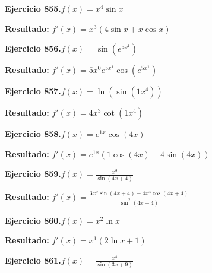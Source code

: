 \documentclass[10pt,a4paper]{article}
\begin{document}
\begin{ejbox}
\textbf{Ejercicio 855.}\quad $f(x) = x^{4} \sin x$
\end{ejbox}

\begin{solbox}
\textbf{Resultado:} \(\displaystyle f'(x) = x^{3}(4\sin x + x\cos x)\)
\end{solbox}

\newpage
\begin{ejbox}
\textbf{Ejercicio 856.}\quad $f(x) = \sin(e^{5x^{1}})$
\end{ejbox}

\begin{solbox}
\textbf{Resultado:} \(\displaystyle f'(x) = 5x^{0}e^{5x^{1}}\cos(e^{5x^{1}})\)
\end{solbox}

\begin{ejbox}
\textbf{Ejercicio 857.}\quad $f(x) = \ln(\sin(1x^{4}))$
\end{ejbox}

\begin{solbox}
\textbf{Resultado:} \(\displaystyle f'(x) = 4x^{3}\cot(1x^{4})\)
\end{solbox}

\begin{ejbox}
\textbf{Ejercicio 858.}\quad $f(x) = e^{1x} \cos(4x)$
\end{ejbox}

\begin{solbox}
\textbf{Resultado:} \(\displaystyle f'(x) = e^{1x}(1\cos(4x) - 4\sin(4x))\)
\end{solbox}

\newpage
\begin{ejbox}
\textbf{Ejercicio 859.}\quad $f(x) = \frac{x^{3}}{\sin(4x +4)}$
\end{ejbox}

\begin{solbox}
\textbf{Resultado:} \(\displaystyle f'(x) = \frac{3x^{2}\sin(4x +4) - 4x^{3}\cos(4x +4)}{\sin^2(4x +4)}\)
\end{solbox}

\begin{ejbox}
\textbf{Ejercicio 860.}\quad $f(x) = x^{2} \ln x$
\end{ejbox}

\begin{solbox}
\textbf{Resultado:} \(\displaystyle f'(x) = x^{1}(2\ln x + 1)\)
\end{solbox}

\begin{ejbox}
\textbf{Ejercicio 861.}\quad $f(x) = \frac{x^{4}}{\sin(3x +9)}$
\end{ejbox}
\end{document}
